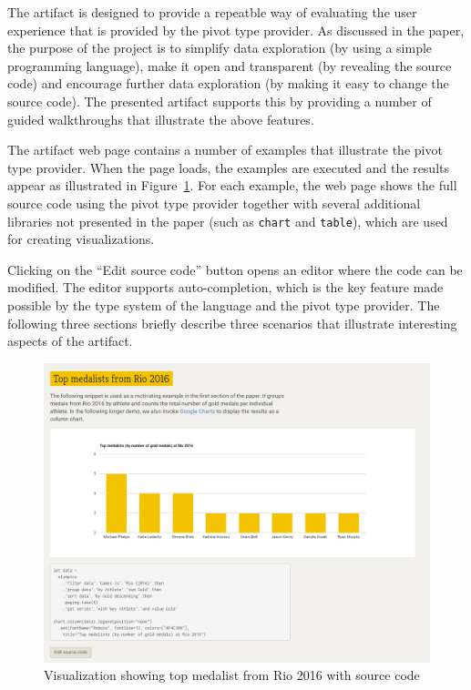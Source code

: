 \documentclass[a4paper,UKenglish]{darts}
\begin{document}
\begin{scope}
The artifact is designed to provide a repeatble way of evaluating the user experience that
is provided by the pivot type provider. As discussed in the paper, the purpose of the project
is to simplify data exploration (by using a simple programming language), make it open and 
transparent (by revealing the source code) and encourage further data exploration (by making
it easy to change the source code). The presented artifact supports this by providing a number
of guided walkthroughs that illustrate the above features.
  
The artifact web page contains a number of examples that illustrate the pivot type provider. When the
page loads, the examples are executed and the results appear as illustrated in Figure~\ref{fig:chart}.
For each example, the web page shows the full source code using the pivot type provider together
with several additional libraries not presented in the paper (such as \texttt{chart} and \texttt{table}),
which are used for creating visualizations.

Clicking on the ``Edit source code'' button opens an editor where the code can be modified. The
editor supports auto-completion, which is the key feature made possible by the type system of the
language and the pivot type provider. The following three sections briefly describe three scenarios
that illustrate interesting aspects of the artifact.

\begin{figure}[t]
\begin{center}
\includegraphics[scale=0.35,trim=0mm 0mm 0mm 0mm,clip]{images/af-preview.png}
\end{center}
\caption{Visualization showing top medalist from Rio 2016 with source code}
\label{fig:chart}
\end{figure}


\end{scope}
\end{document}
